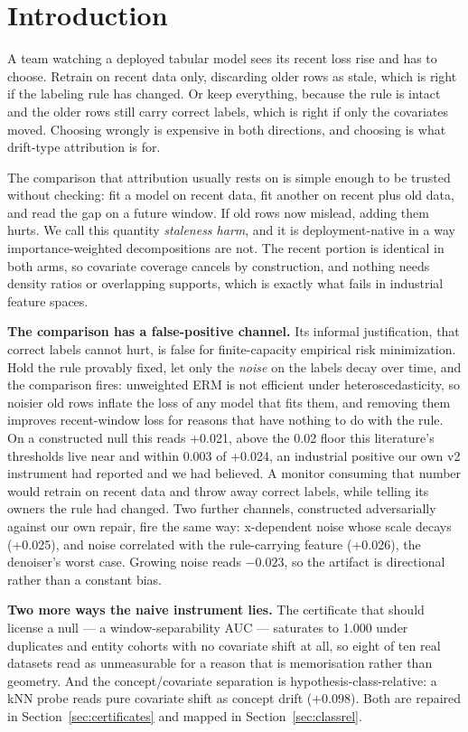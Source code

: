 \documentclass[10pt]{article} %
\begin{document}
\section{Introduction}\label{sec:intro}

A team watching a deployed tabular model sees its recent loss rise and has to choose. Retrain on
recent data only, discarding older rows as stale, which is right if the labeling rule has changed.
Or keep everything, because the rule is intact and the older rows still carry correct labels, which
is right if only the covariates moved. Choosing wrongly is expensive in both directions, and
choosing is what drift-type attribution is for.

The comparison that attribution usually rests on is simple enough to be trusted without checking:
fit a model on recent data, fit another on recent plus old data, and read the gap on a future
window. If old rows now mislead, adding them hurts. We call this quantity \emph{staleness harm}, and it
is deployment-native in a way importance-weighted decompositions are not. The recent portion is
identical in both arms, so covariate coverage cancels by construction, and nothing needs density
ratios or overlapping supports, which is exactly what fails in industrial feature spaces.

\textbf{The comparison has a false-positive channel.} Its informal justification, that correct labels cannot
hurt, is false for finite-capacity empirical risk minimization. Hold the rule provably fixed, let
only the \emph{noise} on the labels decay over time, and the comparison fires: unweighted ERM is not
efficient under heteroscedasticity, so noisier old rows inflate the loss of any model that fits
them, and removing them improves recent-window loss for reasons that have nothing to do with the
rule. On a constructed null this reads +0.021, above the 0.02 floor this literature's thresholds live
near and within 0.003 of +0.024, an industrial positive our own v2 instrument had reported and we
had believed. A monitor consuming that number would retrain on recent data and
throw away correct labels, while telling its owners the rule had changed. Two further channels,
constructed adversarially against our own repair, fire the same way: x-dependent noise whose scale
decays (+0.025), and noise correlated with the rule-carrying feature (+0.026), the denoiser's worst
case. Growing noise reads $-0.023$, so the artifact is directional rather than a constant bias.

\textbf{Two more ways the naive instrument lies.} The certificate that should license a null --- a
window-separability AUC --- saturates to 1.000 under duplicates and entity cohorts with no covariate
shift at all, so eight of ten real datasets read as unmeasurable for a reason that is memorisation
rather than geometry. And the concept/covariate separation is hypothesis-class-relative: a kNN probe
reads pure covariate shift as concept drift ($+0.098$). Both are repaired in
Section~\ref{sec:certificates} and mapped in Section~\ref{sec:classrel}.
\end{document}
